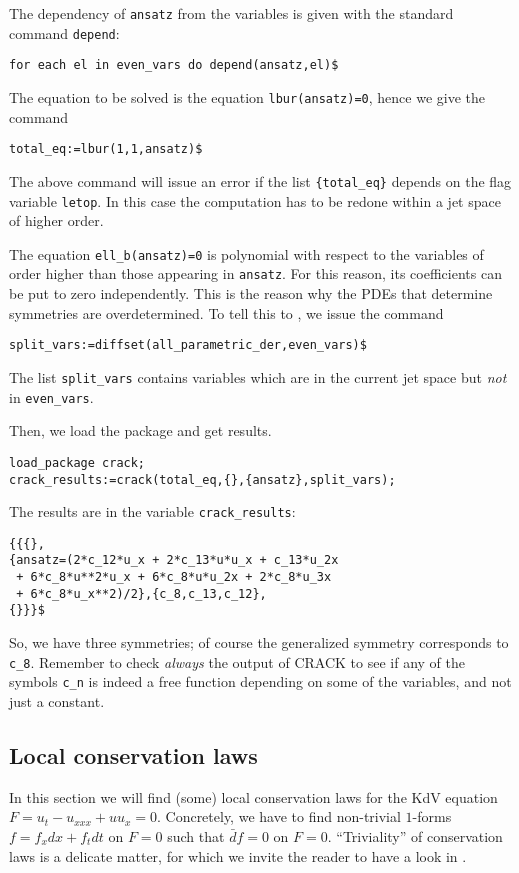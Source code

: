 The dependency of \texttt{ansatz} from the variables is given with the standard
\REDUCE command \texttt{depend}:
\begin{verbatim}
for each el in even_vars do depend(ansatz,el)$
\end{verbatim}
The equation to be solved is the equation \texttt{lbur(ansatz)=0}, hence we
give the command
\begin{verbatim}
total_eq:=lbur(1,1,ansatz)$
\end{verbatim}
The above command will issue an error if the list \texttt{\{total\_eq\}}
depends on the flag variable \texttt{letop}. In this case the computation has
to be redone within a jet space of higher order.

The equation \texttt{ell\_b(ansatz)=0} is polynomial with respect to the
variables of order higher than those appearing in \texttt{ansatz}. For this
reason, its coefficients can be put to zero independently. This is the reason
why the PDEs that determine symmetries are overdetermined. To tell this to
\crack, we issue the command
\begin{verbatim}
split_vars:=diffset(all_parametric_der,even_vars)$
\end{verbatim}
The list \texttt{split\_vars} contains variables which are in the current
\cde jet space but \emph{not} in \texttt{even\_vars}.

Then, we load the package \crack and get results.
\begin{verbatim}
load_package crack;
crack_results:=crack(total_eq,{},{ansatz},split_vars);
\end{verbatim}
The results are in the variable \texttt{crack\_results}:
\begin{verbatim}
{{{},
{ansatz=(2*c_12*u_x + 2*c_13*u*u_x + c_13*u_2x
 + 6*c_8*u**2*u_x + 6*c_8*u*u_2x + 2*c_8*u_3x 
 + 6*c_8*u_x**2)/2},{c_8,c_13,c_12},
{}}}$
\end{verbatim}
So, we have three symmetries; of course the generalized symmetry corresponds to
\texttt{c\_8}. Remember to check \emph{always} the output of CRACK to see if
any of the symbols \texttt{c\_n} is indeed a free function depending on some of
the variables, and not just a constant.


\subsection{Local conservation laws}
\label{cdesec:local-cons-laws}

In this section we will find (some) local conservation laws for the KdV
equation $F=u_t-u_{xxx}+uu_x=0$. Concretely, we have to find non-trivial
$1$-forms $f=f_xdx+f_tdt$ on $F=0$ such that $\bar d f=0$ on
$F=0$. ``Triviality'' of conservation laws is a delicate matter, for which we
invite the reader to have a look in \cite{Krasilshchik:99}.


